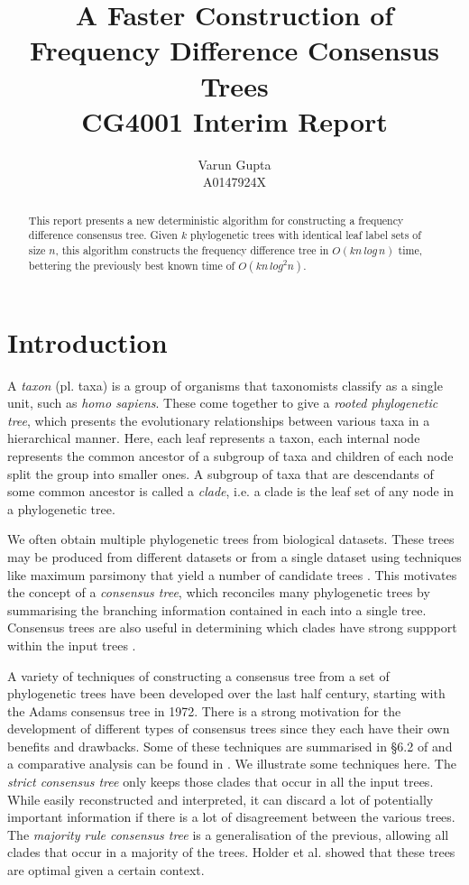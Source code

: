 \documentclass{article}
\title{A Faster Construction of Frequency Difference Consensus Trees\\CG4001 Interim Report}
\author{Varun Gupta\\A0147924X}
\begin{document}
    \maketitle

    \begin{abstract}
        This report presents a new deterministic algorithm for constructing a frequency difference consensus tree. Given $k$ phylogenetic trees with identical leaf label sets of size $n$, this algorithm constructs the frequency difference tree in $O(kn\,log\,n)$ time, bettering the previously best known time of $O(kn\,log^2n)$.
    \end{abstract}

    \section{Introduction}
    \label{sec:introduction}

    A \textit{taxon} (pl. taxa) is a group of organisms that taxonomists classify as a single unit, such as \textit{homo sapiens}. These come together to give a \textit{rooted phylogenetic tree}, which presents the evolutionary relationships between various taxa in a hierarchical manner. Here, each leaf represents a taxon, each internal node represents the common ancestor of a subgroup of taxa and children of each node split the group into smaller ones. A subgroup of taxa that are descendants of some common ancestor is called a \textit{clade}, i.e. a clade is the leaf set of any node in a phylogenetic tree.

    We often obtain multiple phylogenetic trees from biological datasets. These trees may be produced from different datasets or from a single dataset using techniques like maximum parsimony that yield a number of candidate trees \cite{bryant1997hunting}. This motivates the concept of a \textit{consensus tree}, which reconciles many phylogenetic trees by summarising the branching information contained in each into a single tree. Consensus trees are also useful in determining which clades have strong suppport within the input trees \cite{felsenstein2004inferring}.

    A variety of techniques of constructing a consensus tree from a set of phylogenetic trees have been developed over the last half century, starting with the Adams consensus tree \cite{adams1972consensus} in 1972. There is a strong motivation for the development of different types of consensus trees since they each have their own benefits and drawbacks. Some of these techniques are summarised in \S 6.2 of \cite{bryant1997hunting} and a comparative analysis can be found in \cite{bryant2003classification}. We illustrate some techniques here. The \textit{strict consensus tree} \cite{sokal1981taxonomic} only keeps those clades that occur in all the input trees. While easily reconstructed and interpreted, it can discard a lot of potentially important information if there is a lot of disagreement between the various trees. The \textit{majority rule consensus tree} \cite{margush1981consensusn} is a generalisation of the previous, allowing all clades that occur in a majority of the trees. Holder et al. \cite{holder2008justification} showed that these trees are optimal given a certain context.
\end{document}
